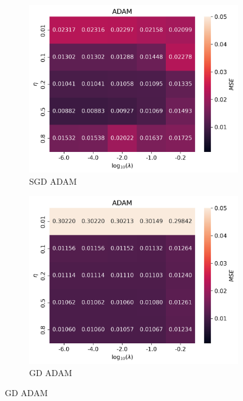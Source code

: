 \documentclass[11pt]{article}
\begin{document}
\begin{figure}[H]

  \begin{subfigure}{.5\textwidth}
    \centering
    \includegraphics[width=\textwidth]{../figures/ADAM_SGD_eta_lmb.png}
    \caption{SGD ADAM}
    \label{fig:}
  \end{subfigure}
  \begin{subfigure}{.5\textwidth}
    \centering
    \includegraphics[width=\textwidth]{../figures/ADAM_GD_eta_lmb.png}
    \caption{GD ADAM}
    \label{fig:}
  \end{subfigure}

\end{figure}
\end{document}

